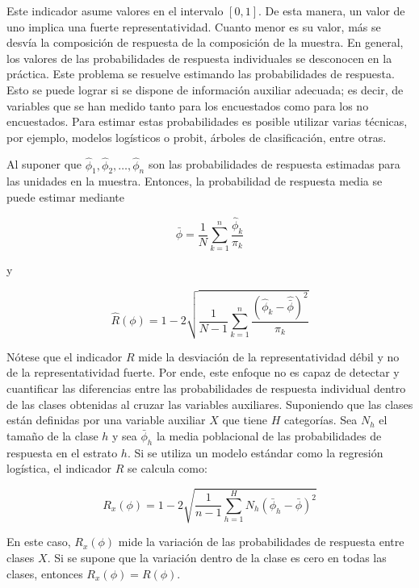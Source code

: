 \documentclass[
  12pt,
]{book}
\begin{document}
Este indicador asume valores en el intervalo \(\left[0,1\right]\). De esta manera, un valor de uno implica una fuerte representatividad. Cuanto menor es su valor, más se desvía la composición de respuesta
de la composición de la muestra. En general, los valores de las probabilidades de respuesta individuales se desconocen en la práctica. Este problema se resuelve estimando las probabilidades de respuesta. Esto se puede lograr si se dispone de información auxiliar adecuada; es decir, de variables que se han medido tanto para los encuestados como para los no encuestados. Para estimar estas probabilidades es posible utilizar varias técnicas, por ejemplo, modelos logísticos o probit, árboles de clasificación, entre otras.

Al suponer que \(\hat{\phi}_{1},\hat{\phi}_{2},\ldots,\hat{\phi}_{n}\) son
las probabilidades de respuesta estimadas para las unidades en la muestra.
Entonces, la probabilidad de respuesta media se puede estimar mediante

\[
\hat{\bar{\phi}}  =  \frac{1}{N}\sum_{k=1}^{n}\frac{\hat{\phi}_{k}}{\pi_{k}}
\]

y

\[
\hat{R}\left(\phi\right)  =  1-2\sqrt{\frac{1}{N-1}\sum_{k=1}^{n}\frac{\left(\hat{\phi}_{k}-\hat{\bar{\phi}}\right)^{2}}{\pi_{k}}}
\]

Nótese que el indicador \(R\) mide la desviación de la representatividad débil y no de la representatividad fuerte. Por ende, este enfoque no es capaz de detectar y cuantificar las diferencias
entre las probabilidades de respuesta individual dentro de las clases obtenidas al cruzar las variables auxiliares. Suponiendo que las clases están definidas por una variable auxiliar \(X\) que tiene \(H\) categorías. Sea \(N_{h}\) el tamaño de la clase \(h\) y sea \(\bar{\phi}_{h}\) la media poblacional de las probabilidades de respuesta en el estrato \(h\). Si se utiliza un modelo estándar como la regresión logística, el indicador \(R\) se calcula como:

\[
R_{x}\left(\phi\right)  =  1-2\sqrt{\frac{1}{n-1}\sum_{h=1}^{H}N_{h}\left(\bar{\phi}_{h}-\bar{\phi}\right)^{2}}
\]

En este caso, \(R_{x}\left(\phi\right)\) mide la variación de las probabilidades de respuesta entre clases \(X\). Si se supone que la variación dentro de la clase es cero en todas las clases, entonces \(R_{x}\left(\phi\right) = R\left(\phi\right)\).
\end{document}
